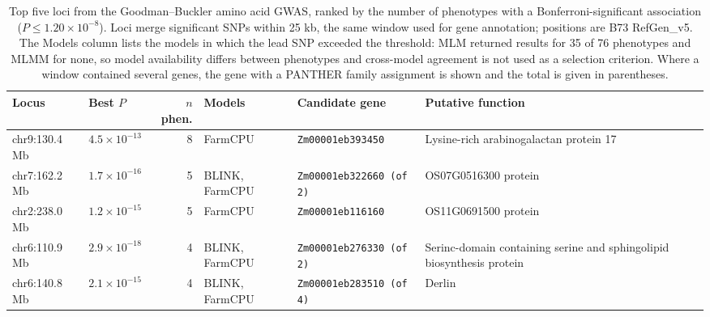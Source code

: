 \begin{table}[t]
\centering
\caption{Top five loci from the Goodman--Buckler amino acid GWAS, ranked by the number of phenotypes with a Bonferroni-significant association ($P \le 1.20 \times 10^{-8}$). Loci merge significant SNPs within 25 kb, the same window used for gene annotation; positions are B73 RefGen\_v5. The Models column lists the models in which the lead SNP exceeded the threshold: MLM returned results for 35 of 76 phenotypes and MLMM for none, so model availability differs between phenotypes and cross-model agreement is not used as a selection criterion. Where a window contained several genes, the gene with a PANTHER family assignment is shown and the total is given in parentheses.}
\label{tab:amino_gwas_top_loci}
\small
\setlength{\tabcolsep}{6pt}
\begin{tabularx}{\textwidth}{@{}l l r l l >{\raggedright\arraybackslash}X@{}}
\hline
Locus & Best $P$ & $n$ phen. & Models & Candidate gene & Putative function \\
\hline
chr9:130.4 Mb & $4.5\times10^{-13}$ & 8 & FarmCPU & \texttt{Zm00001eb393450} & Lysine-rich arabinogalactan protein 17 \\
chr7:162.2 Mb & $1.7\times10^{-16}$ & 5 & BLINK, FarmCPU & \texttt{Zm00001eb322660 (of 2)} & OS07G0516300 protein \\
chr2:238.0 Mb & $1.2\times10^{-15}$ & 5 & FarmCPU & \texttt{Zm00001eb116160} & OS11G0691500 protein \\
chr6:110.9 Mb & $2.9\times10^{-18}$ & 4 & BLINK, FarmCPU & \texttt{Zm00001eb276330 (of 2)} & Serinc-domain containing serine and sphingolipid biosynthesis protein \\
chr6:140.8 Mb & $2.1\times10^{-15}$ & 4 & BLINK, FarmCPU & \texttt{Zm00001eb283510 (of 4)} & Derlin \\
\hline
\end{tabularx}
\end{table}
